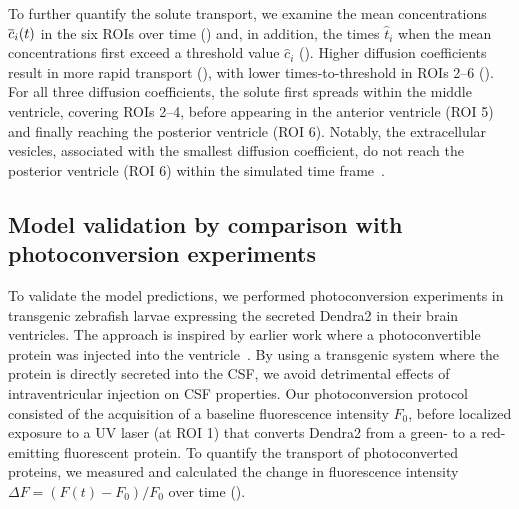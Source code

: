 \documentclass{WileyMSP-template}
\begin{document}
To further quantify the solute transport, we examine the mean
concentrations $\overline{c}_i(t)$ in the six ROIs over time
() and, in addition, the times $\hat{t}_i$
when the mean concentrations first exceed a threshold value
$\hat{c}_i$ ().  Higher diffusion coefficients
result in more rapid transport (), with
lower times-to-threshold in ROIs 2--6 (). For
all three diffusion coefficients, the solute first spreads within the
middle ventricle, covering ROIs 2--4, before appearing in the anterior
ventricle (ROI 5) and finally reaching the posterior ventricle
(ROI 6). Notably, the extracellular vesicles, associated with the smallest diffusion
coefficient, do not reach the posterior ventricle (ROI 6) within the
simulated time frame~.






\subsection{Model validation by comparison with photoconversion experiments}

To validate the model predictions, we performed photoconversion
experiments in transgenic zebrafish larvae expressing the secreted
Dendra2 in their brain ventricles. The approach is inspired by earlier work
where a photoconvertible protein was injected into the ventricle~\cite{fame2016directional}.
By using a transgenic system where the protein is directly secreted into the CSF,
we avoid detrimental effects of intraventricular injection on CSF properties. 
Our photoconversion protocol
consisted of the acquisition of a baseline fluorescence intensity
$F_0$, before localized exposure to a UV laser (at ROI 1) that
converts Dendra2 from a green- to a red-emitting fluorescent
protein. To quantify the transport of photoconverted proteins, we
measured and calculated the change in fluorescence intensity $\Delta F
= (F(t)-F_0)/F_0$ over time ().
\end{document}
